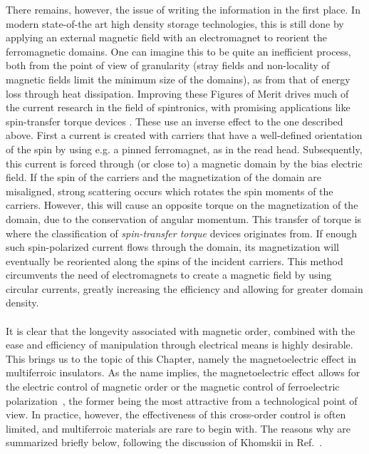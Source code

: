There remains, however, the issue of writing the information in the first place.
In modern state-of-the art high density storage technologies, this is still done by applying an external magnetic field with an electromagnet to reorient the ferromagnetic domains. One can imagine this to be quite an inefficient process, both from the point of view of granularity (stray fields and non-locality of magnetic fields limit the minimum size of the domains), as from that of energy loss through heat dissipation.
Improving these Figures of Merit drives much of the current research in the field of spintronics, with promising applications like spin-transfer torque devices \cite{Nunez2006TheorySemiconductors,Nunez2006TheoryMetals,Nunez2011, Kent2015, Jungwirth2016}.
These use an inverse effect to the one described above.
First a current is created with carriers that have a well-defined orientation of the spin by using e.g. a pinned ferromagnet, as in the read head.
Subsequently, this current is forced through (or close to) a magnetic domain by the bias electric field.
If the spin of the carriers and the magnetization of the domain are misaligned, strong scattering occurs which rotates the spin moments of the carriers.
However, this will cause an opposite torque on the magnetization of the domain, due to the conservation of angular momentum. This transfer of torque is where the classification of {\it spin-transfer torque} devices originates from.
If enough such spin-polarized current flows through the domain, its magnetization will eventually be reoriented along the spins of the incident carriers. This method circumvents the need of electromagnets to create a magnetic field by using circular currents, greatly increasing the efficiency and allowing for greater domain density.
\\\\
It is clear that the longevity associated with magnetic order, combined with the ease and efficiency of manipulation through electrical means is highly desirable.
This brings us to the topic of this Chapter, namely the magnetoelectric effect in multiferroic insulators.
As the name implies, the magnetoelectric effect allows for the electric control of magnetic order or the magnetic control of ferroelectric polarization~\cite{Spaldin2019,Khomskii2009,Fiebig2005,Fiebig2016,Cheong2007}, the former being the most attractive from a technological point of view.
In practice, however, the effectiveness of this cross-order control is often limited, and multiferroic materials are rare to begin with.
The reasons why are summarized briefly below, following the discussion of Khomskii in Ref.~\cite{Khomskii2009}.
